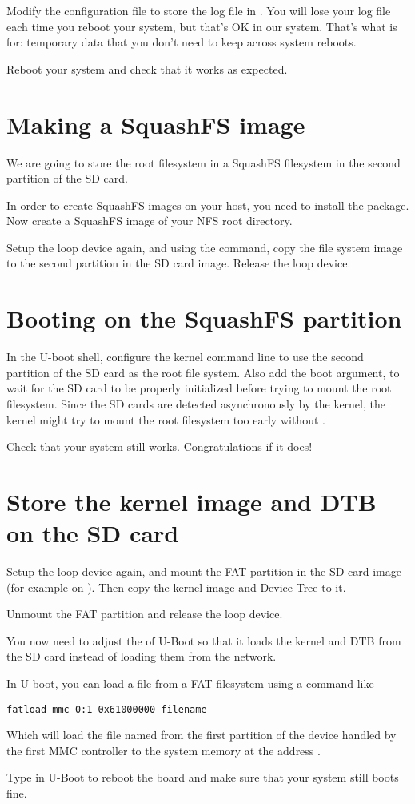 Modify the  configuration file to store
the log file in . You will lose your log
file each time you reboot your system, but that's OK in our
system. That's what  is for: temporary data that you don't need
to keep across system reboots.

Reboot your system and check that it works as expected.

\section{Making a SquashFS image}

We are going to store the root filesystem in a SquashFS filesystem in
the second partition of the SD card.

In order to create SquashFS images on your host, you need to install
the  package. Now create a SquashFS image of your
NFS root directory.

Setup the loop device again, and using the  command,
copy the file system image to the second partition in the SD card
image. Release the loop device.

\section{Booting on the SquashFS partition}

In the U-boot shell, configure the kernel command line to use the
second partition of the SD card as the root file system. Also add the
 boot argument, to wait for the SD card to be properly
initialized before trying to mount the root filesystem. Since the SD
cards are detected asynchronously by the kernel, the kernel might try
to mount the root filesystem too early without .

Check that your system still works. Congratulations if it does!

\section{Store the kernel image and DTB on the SD card}

Setup the loop device again, and mount the FAT partition
in the SD card image (for example on ).
Then copy the kernel image and Device Tree to it.

Unmount the FAT partition and release the loop device.

You now need to adjust the  of U-Boot so
that it loads the kernel and DTB from the SD card instead of loading
them from the network.

In U-boot, you can load a file from a FAT filesystem using a command
like

\begin{verbatim}
fatload mmc 0:1 0x61000000 filename
\end{verbatim}

Which will load the file named  from the first
partition of the device handled by the first MMC controller to the
system memory at the address .

Type  in U-Boot to reboot the board and make
sure that your system still boots fine.
